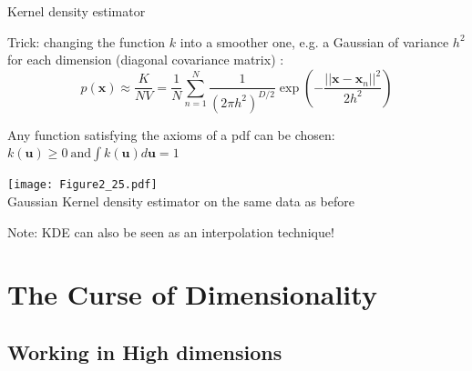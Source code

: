\documentclass{beamer}
\begin{document}
\begin{frame}{Kernel density estimator}


Trick: changing the function $k$ into a smoother one, e.g. a Gaussian of variance $h^{2}$ for each dimension (diagonal covariance matrix) :
\vspace{-0.3cm}
\begin{equation*}
p(\mathbf{x}) \approx \frac{K}{NV} = \frac{1}{N}\sum_{n=1}^{N} \frac{1}{(2\pi h^{2})^{D/2}} \exp\left(-\frac{||\mathbf{x}-\mathbf{x}_{n}||^{2}}{2h^2}\right)
\end{equation*}

Any function satisfying the axioms of a pdf can be chosen:
$k(\mathbf{u}) \geq 0 \  \textrm{and} \int k(\mathbf{u}) d\mathbf{u} = 1$


\begin{center}
\vspace{-0.2cm}
\texttt{[image: Figure2\_25.pdf]}\\
\tiny{Gaussian Kernel density estimator on the same data as before}
\end{center}

Note: KDE can also be seen as an interpolation technique!
\end{frame}

\section{The Curse of Dimensionality}
\subsection{Working in High dimensions}
\end{document}
